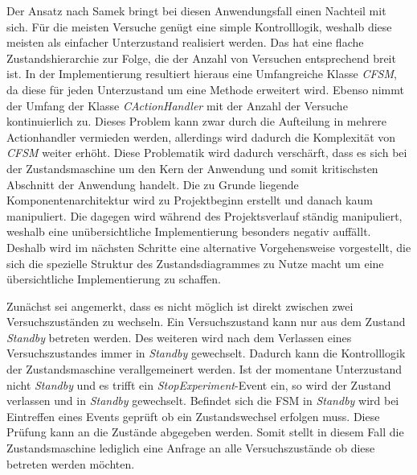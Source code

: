Der Ansatz nach Samek bringt bei diesen Anwendungsfall einen Nachteil mit sich. Für die meisten Versuche genügt eine simple Kontrolllogik, weshalb diese meisten als einfacher Unterzustand realisiert werden. Das hat eine flache Zustandshierarchie zur Folge, die der Anzahl von Versuchen entsprechend breit ist. In der Implementierung resultiert hieraus eine Umfangreiche Klasse \textit{CFSM}, da diese für jeden Unterzustand um eine Methode erweitert wird. Ebenso nimmt der Umfang der Klasse \textit{CActionHandler} mit der Anzahl der Versuche kontinuierlich zu. Dieses Problem kann zwar durch die Aufteilung in mehrere Actionhandler vermieden werden, allerdings wird dadurch die Komplexität von \textit{CFSM} weiter erhöht. Diese Problematik wird dadurch verschärft, dass es sich bei der Zustandsmaschine um den Kern der Anwendung und somit kritischsten Abschnitt der Anwendung handelt. Die zu Grunde liegende Komponentenarchitektur wird zu Projektbeginn erstellt und danach kaum manipuliert. Die dagegen wird während des Projektsverlauf ständig manipuliert, weshalb eine unübersichtliche Implementierung besonders negativ auffällt. Deshalb wird im nächsten Schritte eine alternative Vorgehensweise vorgestellt, die sich die spezielle Struktur des Zustandsdiagrammes zu Nutze macht um eine übersichtliche Implementierung zu schaffen.

Zunächst sei angemerkt, dass es nicht möglich ist direkt zwischen zwei Versuchszuständen zu wechseln. Ein Versuchszustand kann nur aus dem Zustand \textit{Standby} betreten werden. Des weiteren wird nach dem Verlassen eines Versuchszustandes immer in \textit{Standby} gewechselt. Dadurch kann die Kontrolllogik der Zustandsmaschine verallgemeinert werden. Ist der momentane Unterzustand nicht \textit{Standby} und es trifft ein \textit{StopExperiment}-Event ein, so wird der Zustand verlassen und in \textit{Standby} gewechselt. Befindet sich die FSM in \textit{Standby} wird bei Eintreffen eines Events geprüft ob ein Zustandswechsel erfolgen muss. Diese Prüfung kann an die Zustände abgegeben werden. Somit stellt in diesem Fall die Zustandsmaschine lediglich eine Anfrage an alle Versuchszustände ob diese betreten werden möchten.


